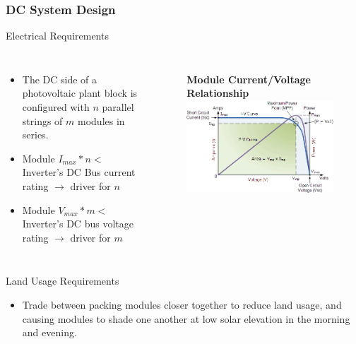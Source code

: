 \documentclass[aspectratio=169]{beamer}
\begin{document}
\begin{frame}
  \frametitle{DC System Design}
  \begin{block}{Electrical Requirements}
    \begin{columns}
      \begin{itemize}
      \item The DC side of a photovoltaic plant block is configured
        with $n$ parallel strings of $m$ modules in series.
      \item Module $I_{max} * n <$ Inverter's DC Bus current rating
        $\rightarrow$ driver for $n$
      \item Module $V_{max} * m <$ Inverter's DC bus voltage rating
        $\rightarrow$ driver for $m$
      \end{itemize}

      \begin{figure}
        \textbf{Module Current/Voltage Relationship}
        \includegraphics[width=0.75\linewidth]{IV_Curve.png}
      \end{figure}
    \end{columns}
  \end{block}
  \begin{block}{Land Usage Requirements}
    \begin{itemize}
    \item Trade between packing modules closer together to reduce land
      usage, and causing modules to shade one another at low solar
      elevation in the morning and evening.
    \end{itemize}
  \end{block}
\end{frame}
\end{document}
